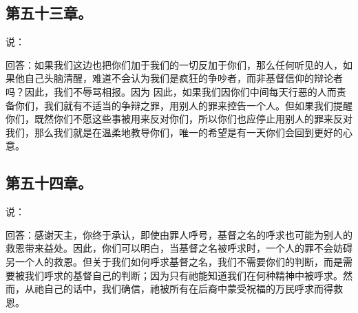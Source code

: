 
\subsection{第五十三章。}

 说：\par

 回答：如果我们这边也把你们加于我们的一切反加于你们，那么任何听见的人，如果他自己头脑清醒，难道不会认为我们是疯狂的争吵者，而非基督信仰的辩论者吗？因此，我们不辱骂相报。因为 因此，如果我们因你们中间每天行恶的人而责备你们，我们就有不适当的争辩之罪，用别人的罪来控告一个人。但如果我们提醒你们，既然你们不愿这些事被用来反对你们，所以你们也应停止用别人的罪来反对我们，那么我们就是在温柔地教导你们，唯一的希望是有一天你们会回到更好的心意。\par


\subsection{第五十四章。}

 说：\par

 回答：感谢天主，你终于承认，即使由罪人呼号，基督之名的呼求也可能为别人的救恩带来益处。因此，你们可以明白，当基督之名被呼求时，一个人的罪不会妨碍另一个人的救恩。但关于我们如何呼求基督之名，我们不需要你们的判断，而是需要被我们呼求的基督自己的判断；因为只有祂能知道我们在何种精神中被呼求。然而，从祂自己的话中，我们确信，祂被所有在后裔中蒙受祝福的万民呼求而得救恩。\par

